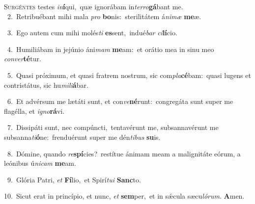 \lettrine{\initial\textcolor{\initialcolor}{S}}{urgéntes} testes \textit{in}\-\textbf{í}qui,~\star quæ ignorábam in\-\textit{ter}\-\textit{ro}\textbf{gá}bant me.\\
{\numbfont\textcolor{\numbcolor}{~2.}}~Retribuébant mihi mala \textit{pro} \textbf{bo}\-nis:~\star sterilitátem á\-\textit{ni}\-\textit{mæ} \textbf{me}\-æ.\par
{\numbfont\textcolor{\numbcolor}{~3.}}~Ego autem cum mihi molés\textit{ti} \textbf{es}\-sent,~\star indué\textit{bar} \textit{ci}\-\textbf{lí}cio.\par
{\numbfont\textcolor{\numbcolor}{~4.}}~Humiliábam in jejúnio áni\textit{mam} \textbf{me}\-am:~\star et orátio mea in sinu meo \textit{con}\-\textit{ver}\textbf{té}tur.\par
{\numbfont\textcolor{\numbcolor}{~5.}}~Quasi próximum, et quasi fratrem nostrum, sic com\-\textit{pla}\-\textbf{cé}bam:~\star quasi lugens et contristátus, sic hu\-\textit{mi}\-\textit{li}\textbf{á}bar.\par
{\numbfont\textcolor{\numbcolor}{~6.}}~Et advérsum me lætáti sunt, et con\-\textit{ve}\-\textbf{né}runt:~\star congregáta sunt super me flagélla, et \textit{i}\-\textit{gno}\textbf{rá}vi.\par
{\numbfont\textcolor{\numbcolor}{~7.}}~Dissipáti sunt, nec compúncti,~\dagger tentavérunt me, subsannavérunt me subsanna\-\textit{ti}\-\textbf{ó}ne:~\star frenduérunt super me dén\-\textit{ti}\-\textit{bus} \textbf{su}\-is.\par
{\numbfont\textcolor{\numbcolor}{~8.}}~Dómine, quando \textit{re}\-\textbf{spí}cies?~\star restítue ánimam meam a malignitáte eórum, a leónibus ú\-\textit{ni}\-\textit{cam} \textbf{me}\-am.\par
{\numbfont\textcolor{\numbcolor}{~9.}}~Glória Patri, \textit{et} \textbf{Fí}\-lio,~\star et Spirí\-\textit{tu}\-\textit{i} \textbf{Sanc}\-to.\par
{\numbfont\textcolor{\numbcolor}{10.}}~Sicut erat in princípio, et nunc, \textit{et} \textbf{sem}\-per,~\star et in sǽcula sæcu\-\textit{ló}\-\textit{rum}. \textbf{A}\-men.\par
